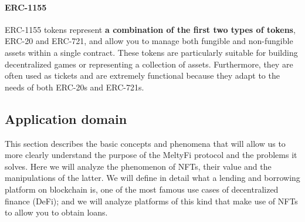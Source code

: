 \paragraph{ERC-1155}
ERC-1155 tokens represent \textbf{a combination of the first two types of tokens}, ERC-20 and ERC-721, and allow you to manage both fungible and non-fungible assets within a single contract. These tokens are particularly suitable for building decentralized games or representing a collection of assets. Furthermore, they are often used as tickets and are extremely functional because they adapt to the needs of both ERC-20s and ERC-721s.

\subsection{Application domain}
This section describes the basic concepts and phenomena that will allow us to more clearly understand the purpose of the MeltyFi protocol and the problems it solves. Here we will analyze the phenomenon of NFTs, their value and the manipulations of the latter. We will define in detail what a lending and borrowing platform on blockchain is, one of the most famous use cases of decentralized finance (DeFi); and we will analyze platforms of this kind that make use of NFTs to allow you to obtain loans.

